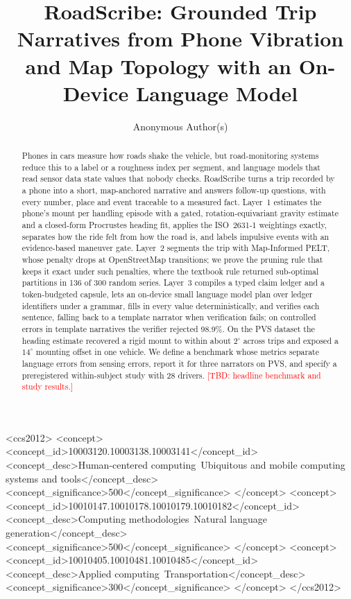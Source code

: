 \documentclass[manuscript,screen,review,anonymous]{acmart}
\newcommand{\TBD}[1][]{\textcolor{red}{[TBD#1]}}
\begin{document}
\title[RoadScribe]{RoadScribe: Grounded Trip Narratives from Phone Vibration and Map Topology with an On-Device Language Model}

\author{Anonymous Author(s)}

\begin{abstract}
Phones in cars measure how roads shake the vehicle, but road-monitoring systems reduce this to a label or a roughness index per segment, and language models that read sensor data state values that nobody checks.
RoadScribe turns a trip recorded by a phone into a short, map-anchored narrative and answers follow-up questions, with every number, place and event traceable to a measured fact.
Layer~1 estimates the phone's mount per handling episode with a gated, rotation-equivariant gravity estimate and a closed-form Procrustes heading fit, applies the ISO~2631-1 weightings exactly, separates how the ride felt from how the road is, and labels impulsive events with an evidence-based maneuver gate.
Layer~2 segments the trip with Map-Informed PELT, whose penalty drops at OpenStreetMap transitions; we prove the pruning rule that keeps it exact under such penalties, where the textbook rule returned sub-optimal partitions in 136 of 300 random series.
Layer~3 compiles a typed claim ledger and a token-budgeted capsule, lets an on-device small language model plan over ledger identifiers under a grammar, fills in every value deterministically, and verifies each sentence, falling back to a template narrator when verification fails; on controlled errors in template narratives the verifier rejected 98.9\%.
On the PVS dataset the heading estimate recovered a rigid mount to within about $2^\circ$ across trips and exposed a $14^\circ$ mounting offset in one vehicle.
We define a benchmark whose metrics separate language errors from sensing errors, report it for three narrators on PVS, and specify a preregistered within-subject study with 28 drivers.
\TBD[: headline benchmark and study results.]
\end{abstract}

\begin{CCSXML}
<ccs2012>
 <concept>
  <concept_id>10003120.10003138.10003141</concept_id>
  <concept_desc>Human-centered computing~Ubiquitous and mobile computing systems and tools</concept_desc>
  <concept_significance>500</concept_significance>
 </concept>
 <concept>
  <concept_id>10010147.10010178.10010179.10010182</concept_id>
  <concept_desc>Computing methodologies~Natural language generation</concept_desc>
  <concept_significance>500</concept_significance>
 </concept>
 <concept>
  <concept_id>10010405.10010481.10010485</concept_id>
  <concept_desc>Applied computing~Transportation</concept_desc>
  <concept_significance>300</concept_significance>
 </concept>
</ccs2012>
\end{CCSXML}
\end{document}
